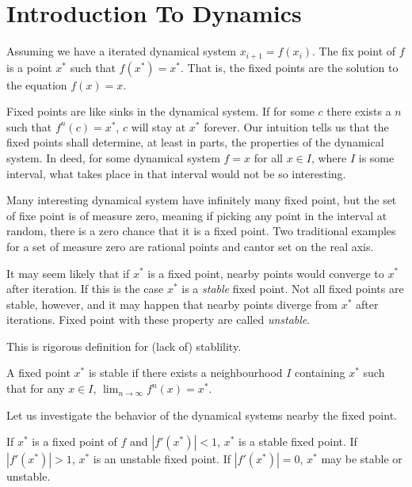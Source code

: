\section{Introduction To Dynamics}

\begin{defn}
	Assuming we have a iterated dynamical system $x_{i+1} = f(x_i)$. 
	The fix point of $f$ is a point $x^*$ such that $f(x^*) = x^*$. 
	That is, the fixed points are the solution to the equation $f(x) = x$.
\end{defn}

Fixed points are like sinks in the dynamical system. 
If for some $c$ there exists a $n$ such that $f^n(c) = x^*$, $c$ will stay at $x^*$ forever. 
Our intuition tells us that the fixed points shall determine, at least in parts, the properties of the dynamical system.
In deed, for some dynamical system $f = x$ for all $x \in I$, where $I$ is some interval, what takes place in that interval would not be so interesting.

Many interesting dynamical system have infinitely many fixed point, but the set of fixe point is of measure zero, meaning if picking any point in the interval at random, there is a zero chance that it is a fixed point.
Two traditional examples for a set of measure zero are rational points and cantor set on the real axis. 

It may seem likely that if $x^*$ is a fixed point, nearby points would converge to $x^*$ after iteration.
If this is the case $x^*$ is a \emph{stable} fixed point.
Not all fixed points are stable, however, and it may happen that nearby points diverge from $x^*$ after iterations. 
Fixed point with these property are called \emph{unstable}.

This is rigorous definition for (lack of) stablility.
\begin{defn}
	A fixed point $x^*$ is stable if there exists a neighbourhood $I$ containing $x^*$ such that for any $x \in I$, $\lim_{n \rightarrow \infty}f^n(x) = x^*$.
\end{defn}
Let us investigate the behavior of the dynamical systems nearby the fixed point.

\begin{thm}\label{th:_stable_unstable_fixed_point}
	If $x^*$ is a fixed point of $f$ and $|f'(x^*)| < 1$, $x^*$ is a stable fixed point.
	If $|f'(x^*)| > 1$, $x^*$ is an unstable fixed point.
	If $|f'(x^*)| = 0$, $x^*$ may be stable or unstable.
\end{thm}

